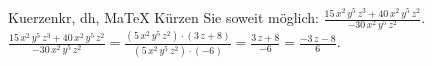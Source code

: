 \begin{MAufgabe}{Kuerzen}{kr, dh, MaTeX}
K\"urzen Sie soweit m\"oglich: $\frac{15\, x^2\, y^5\, z^3 + 40\, x^2\, y^5\, z^2}{- 30\, x^2\, y^5\, z^2}$.\\ 
\ifLsg\MLoesung
\quad $\frac{15\, x^2\, y^5\, z^3 + 40\, x^2\, y^5\, z^2}{- 30\, x^2\, y^5\, z^2}=\frac{(5\, x^2\, y^5\, z^2)\cdot(3\, z + 8)}{(5\, x^2\, y^5\, z^2)\cdot(-6)}=\frac{3\, z + 8}{-6}=\frac{ - 3\, z - 8}{6}$.\else\relax\fi
 \end{MAufgabe}